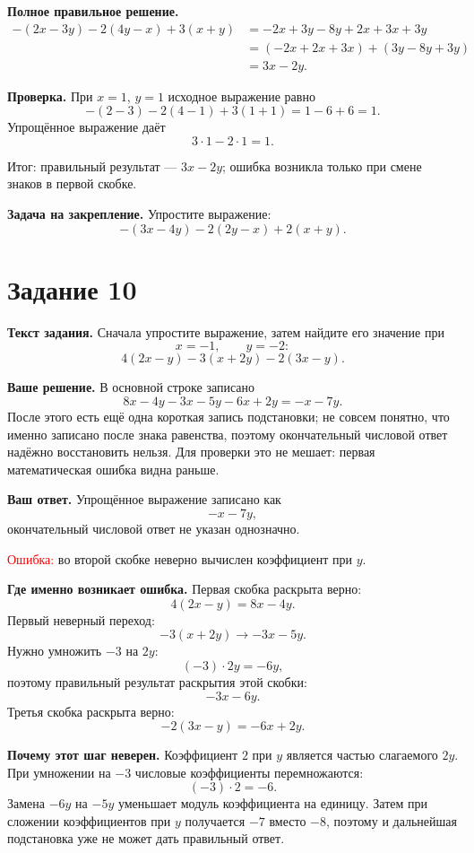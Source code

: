 \documentclass[12pt,a4paper]{article}
\begin{document}
\textbf{Полное правильное решение.}
\[
\begin{aligned}
-(2x-3y)-2(4y-x)+3(x+y)
&=-2x+3y-8y+2x+3x+3y\\
&=(-2x+2x+3x)+(3y-8y+3y)\\
&=3x-2y.
\end{aligned}
\]

\textbf{Проверка.}
При $x=1$, $y=1$ исходное выражение равно
\[
-(2-3)-2(4-1)+3(1+1)=1-6+6=1.
\]
Упрощённое выражение даёт
\[
3\cdot 1-2\cdot 1=1.
\]

\textcolor{teal!60!black}{Итог:} правильный результат --- $3x-2y$; ошибка возникла только при смене знаков в первой скобке.

\textbf{Задача на закрепление.}
Упростите выражение:
\[
-(3x-4y)-2(2y-x)+2(x+y).
\]

\newpage
{}\label{task:10}
\section*{Задание 10}

\textbf{Текст задания.}
Сначала упростите выражение, затем найдите его значение при
\[
x=-1,\qquad y=-2:
\]
\[
4(2x-y)-3(x+2y)-2(3x-y).
\]

\textbf{Ваше решение.}
В основной строке записано
\[
8x-4y-3x-5y-6x+2y=-x-7y.
\]
После этого есть ещё одна короткая запись подстановки; не совсем понятно, что именно записано после знака равенства, поэтому окончательный числовой ответ надёжно восстановить нельзя. Для проверки это не мешает: первая математическая ошибка видна раньше.

\textbf{Ваш ответ.}
Упрощённое выражение записано как
\[
-x-7y,
\]
окончательный числовой ответ не указан однозначно.

\textcolor{red}{Ошибка:} во второй скобке неверно вычислен коэффициент при $y$.

\textbf{Где именно возникает ошибка.}
Первая скобка раскрыта верно:
\[
4(2x-y)=8x-4y.
\]
Первый неверный переход:
\[
-3(x+2y)\rightarrow -3x-5y.
\]
Нужно умножить $-3$ на $2y$:
\[
(-3)\cdot 2y=-6y,
\]
поэтому правильный результат раскрытия этой скобки:
\[
-3x-6y.
\]
Третья скобка раскрыта верно:
\[
-2(3x-y)=-6x+2y.
\]

\textbf{Почему этот шаг неверен.}
Коэффициент $2$ при $y$ является частью слагаемого $2y$. При умножении на $-3$ числовые коэффициенты перемножаются:
\[
(-3)\cdot 2=-6.
\]
Замена $-6y$ на $-5y$ уменьшает модуль коэффициента на единицу. Затем при сложении коэффициентов при $y$ получается $-7$ вместо $-8$, поэтому и дальнейшая подстановка уже не может дать правильный ответ.
\end{document}
